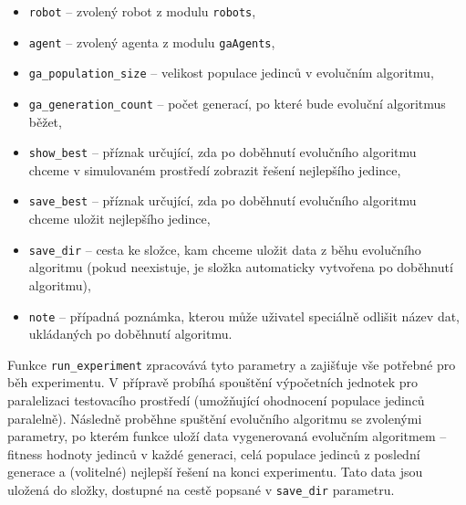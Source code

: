 \begin{itemize}
    \item \texttt{robot} -- zvolený robot z modulu \texttt{robots},
    \item \texttt{agent} -- zvolený agenta z modulu \texttt{gaAgents},
    \item \texttt{ga\_population\_size} -- velikost populace jedinců v
        evolučním algoritmu,
    \item \texttt{ga\_generation\_count} -- počet generací, po které bude
        evoluční algoritmus běžet,
    \item \texttt{show\_best} -- příznak určující, zda po doběhnutí evolučního
        algoritmu \\chceme v simulovaném prostředí zobrazit řešení nejlepšího
        jedince,
    \item \texttt{save\_best} -- příznak určující, zda po doběhnutí evolučního
        algoritmu \\chceme uložit nejlepšího jedince,
    \item \texttt{save\_dir} -- cesta ke složce, kam chceme uložit data z běhu
        evolučního algoritmu (pokud neexistuje, je složka automaticky vytvořena
        po doběhnutí algoritmu),
    \item \texttt{note} -- případná poznámka, kterou může uživatel speciálně
        odlišit název dat, ukládaných po doběhnutí algoritmu.
\end{itemize}

Funkce \texttt{run\_experiment} zpracovává tyto parametry a zajišťuje vše
potřebné pro běh experimentu. V přípravě probíhá spouštění výpočetních
jednotek pro paralelizaci testovacího prostředí (umožňující ohodnocení
populace jedinců paralelně). Následně proběhne spuštění evolučního algoritmu se
zvolenými parametry, po kterém funkce uloží data vygenerovaná evolučním
algoritmem -- fitness hodnoty jedinců v každé generaci, celá
populace jedinců z poslední generace a (volitelné) nejlepší řešení na konci
experimentu. Tato data jsou uložená do složky, dostupné na cestě popsané v
\texttt{save\_dir} parametru.

